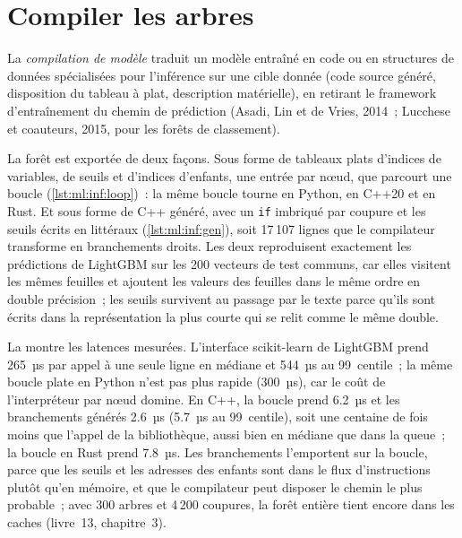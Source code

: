 \section{Compiler les arbres}

\begin{definition}\label{def:ml:low-latency-inference:compile}
La \emph{compilation de modèle} traduit un modèle entraîné en code ou en structures de données spécialisées pour
l'inférence sur une cible donnée (code source généré, disposition du tableau à plat, description matérielle), en retirant le framework d'entraînement du
chemin de prédiction (Asadi, Lin et de Vries, 2014~; Lucchese et coauteurs, 2015, pour les forêts de classement).
\end{definition}

La forêt est exportée de deux façons. Sous forme de tableaux plats d'indices de variables, de seuils et d'indices d'enfants, une entrée par nœud, que parcourt
une boucle (\cref{lst:ml:inf:loop})~: la même boucle tourne en Python, en C++20 et en Rust. Et sous forme de C++ généré, avec un
\texttt{if} imbriqué par coupure et les seuils écrits en littéraux (\cref{lst:ml:inf:gen}), soit 17\,107 lignes que le compilateur transforme en
branchements droits. Les deux reproduisent exactement les prédictions de LightGBM sur les 200 vecteurs de test communs, car elles visitent les mêmes
feuilles et ajoutent les valeurs des feuilles dans le même ordre en double précision~; les seuils survivent au passage par le texte parce qu'ils sont
écrits dans la représentation la plus courte qui se relit comme le même double.

La  montre les latences mesurées. L'interface scikit-learn de LightGBM prend 265~µs par appel à une seule
ligne en médiane et 544~µs au 99~centile~; la même boucle plate en Python n'est pas plus rapide (300~µs), car le coût de l'interpréteur
par nœud domine. En C++, la boucle prend 6.2~µs et les branchements générés 2.6~µs (5.7~µs au 99~centile), soit une
centaine de fois moins que l'appel de la bibliothèque, aussi bien en médiane que dans la queue~; la boucle en Rust prend 7.8~µs. Les branchements l'emportent sur
la boucle, parce que les seuils et les adresses des enfants sont dans le flux d'instructions plutôt qu'en mémoire, et que le compilateur
peut disposer le chemin le plus probable~; avec 300 arbres et 4\,200 coupures, la forêt entière tient encore dans les caches (livre~13, chapitre~3).

